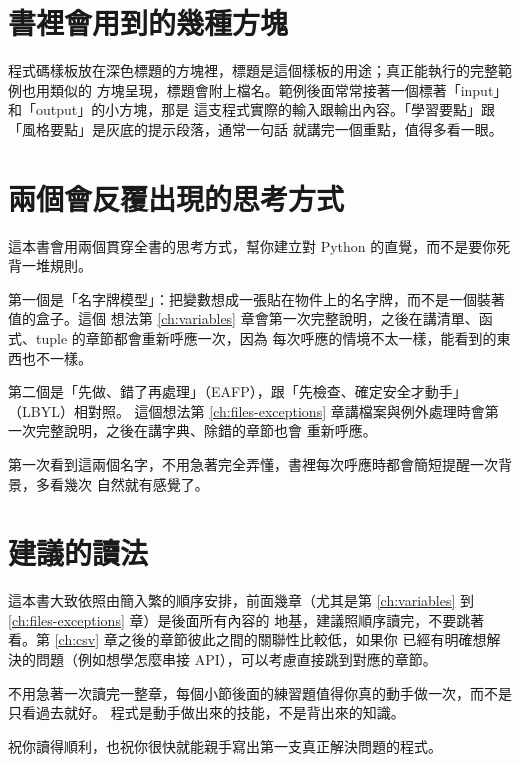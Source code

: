 \section*{書裡會用到的幾種方塊}

程式碼樣板放在深色標題的方塊裡，標題是這個樣板的用途；真正能執行的完整範例也用類似的
方塊呈現，標題會附上檔名。範例後面常常接著一個標著「input」和「output」的小方塊，那是
這支程式實際的輸入跟輸出內容。「學習要點」跟「風格要點」是灰底的提示段落，通常一句話
就講完一個重點，值得多看一眼。

\section*{兩個會反覆出現的思考方式}

這本書會用兩個貫穿全書的思考方式，幫你建立對 Python 的直覺，而不是要你死背一堆規則。

第一個是「名字牌模型」：把變數想成一張貼在物件上的名字牌，而不是一個裝著值的盒子。這個
想法第 \ref{ch:variables} 章會第一次完整說明，之後在講清單、函式、tuple 的章節都會重新呼應一次，因為
每次呼應的情境不太一樣，能看到的東西也不一樣。

第二個是「先做、錯了再處理」（EAFP），跟「先檢查、確定安全才動手」（LBYL）相對照。
這個想法第 \ref{ch:files-exceptions} 章講檔案與例外處理時會第一次完整說明，之後在講字典、除錯的章節也會
重新呼應。

第一次看到這兩個名字，不用急著完全弄懂，書裡每次呼應時都會簡短提醒一次背景，多看幾次
自然就有感覺了。

\section*{建議的讀法}

這本書大致依照由簡入繁的順序安排，前面幾章（尤其是第 \ref{ch:variables} 到 \ref{ch:files-exceptions} 章）是後面所有內容的
地基，建議照順序讀完，不要跳著看。第 \ref{ch:csv} 章之後的章節彼此之間的關聯性比較低，如果你
已經有明確想解決的問題（例如想學怎麼串接 API），可以考慮直接跳到對應的章節。

不用急著一次讀完一整章，每個小節後面的練習題值得你真的動手做一次，而不是只看過去就好。
程式是動手做出來的技能，不是背出來的知識。

祝你讀得順利，也祝你很快就能親手寫出第一支真正解決問題的程式。
